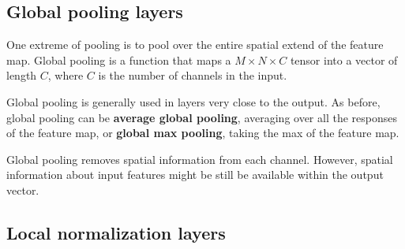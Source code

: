 
\subsection{Global pooling layers}

One extreme of pooling is to pool over the entire spatial extend of the feature map. Global pooling is a function that maps a $M \times N \times C$ tensor into a vector of length $C$, where $C$ is the number of channels in the input. 

Global pooling is generally used in layers very close to the output. As before, global pooling can be {\bf average global pooling}, averaging over all the responses of the feature map, or {\bf global max pooling}, taking the max of the feature map.   

Global pooling removes spatial information from each channel. However, spatial information about input features might be still be available within the output vector. 

\subsection{Local normalization layers}

